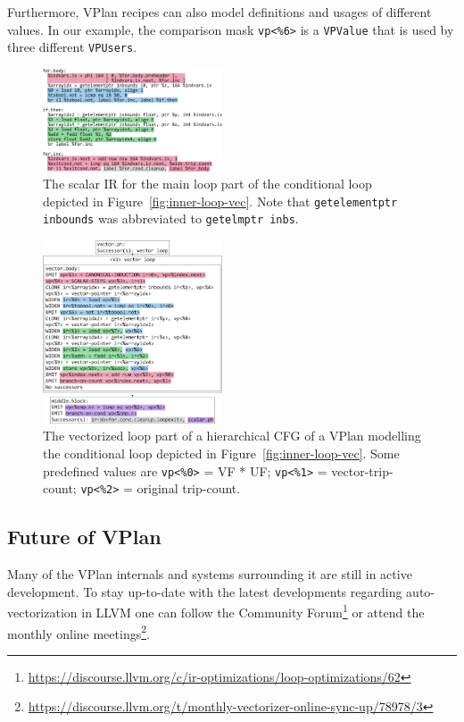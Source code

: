 \documentclass[sigplan,11pt,nonacm]{acmart}
\begin{document}
Furthermore, VPlan recipes can also model definitions and usages of different values. In our example,
the comparison mask \texttt{vp<\%6>} is a \texttt{VPValue} that is used by three different 
\texttt{VPUsers}.

\begin{figure}
  \centering
  \includegraphics[width=0.475\textwidth]{images/inner-loop-scalar-loop-ir-color.png}
  \caption{The scalar IR for the main loop part of the conditional loop depicted in
  Figure~\ref{fig:inner-loop-vec}. Note that \texttt{getelementptr inbounds}
  was abbreviated to \texttt{getelmptr inbs}.}
  \label{fig:inner-loop-scalar-ir}
\end{figure}

\begin{figure}
  \centering
  \includegraphics[width=0.475\textwidth]{images/inner-loop-vplan-hcfg-loop-body-color.png}
  \caption{The vectorized loop part of a hierarchical CFG of a VPlan modelling the conditional loop
  depicted in Figure~\ref{fig:inner-loop-vec}. Some predefined values are
  \texttt{vp<\%0>} = VF * UF; \texttt{vp<\%1>} = vector-trip-count; \texttt{vp<\%2>} = original trip-count.}
  \label{fig:inner-loop-vplan-hcfg-body}
\end{figure}

\subsection{Future of VPlan}
Many of the VPlan internals and systems surrounding it are still in active development. To stay
up-to-date with the latest developments regarding auto-vectorization in LLVM one can follow the 
Community Forum\footnote{\url{https://discourse.llvm.org/c/ir-optimizations/loop-optimizations/62}} or
attend the monthly online 
meetings\footnote{\url{https://discourse.llvm.org/t/monthly-vectorizer-online-sync-up/78978/3}}.
\end{document}
